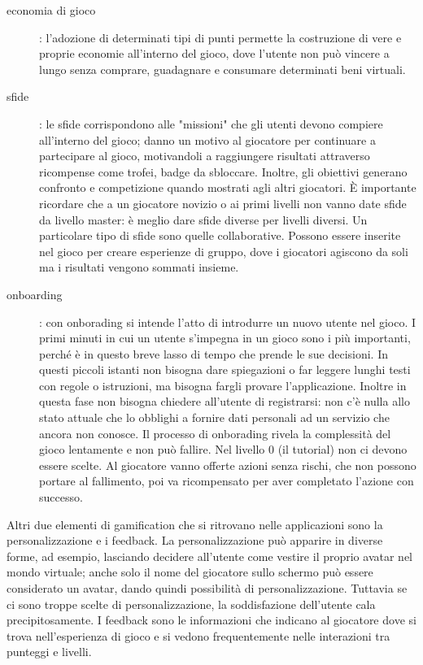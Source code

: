 \begin{description}
    \item[economia di gioco]: l'adozione di determinati tipi di punti permette la costruzione di vere e proprie economie all'interno del gioco, dove l'utente non può vincere a lungo senza comprare, guadagnare e consumare determinati beni virtuali.
    \item[sfide]: le sfide corrispondono alle "missioni" che gli utenti devono compiere all'interno del gioco; danno un motivo al giocatore per continuare a partecipare al gioco, motivandoli a raggiungere risultati attraverso ricompense come trofei, badge da sbloccare. Inoltre, gli obiettivi generano confronto e competizione quando mostrati agli altri giocatori. È importante ricordare che a un giocatore novizio o ai primi livelli non vanno date sfide da livello master: è meglio dare sfide diverse per livelli diversi. Un particolare tipo di sfide sono quelle collaborative. Possono essere inserite nel gioco per creare esperienze di gruppo, dove i giocatori agiscono da soli ma i risultati vengono sommati insieme.
    \item[onboarding]: con onborading si intende l'atto di introdurre un nuovo utente nel gioco. I primi minuti in cui un utente s'impegna in un gioco sono i più importanti, perché è in questo breve lasso di tempo che prende le sue decisioni. In questi piccoli istanti non bisogna dare spiegazioni o far leggere lunghi testi con regole o istruzioni, ma bisogna fargli provare l'applicazione. Inoltre in questa fase non bisogna chiedere all'utente di registrarsi: non c'è nulla allo stato attuale che lo obblighi a fornire dati personali ad un servizio che ancora non conosce. Il processo di onborading rivela la complessità del gioco lentamente e non può fallire. Nel livello 0 (il tutorial) non ci devono essere scelte. Al giocatore vanno offerte azioni senza rischi, che non possono portare al fallimento, poi va ricompensato per aver completato l'azione con successo.
\end{description}

Altri due elementi di gamification che si ritrovano nelle applicazioni sono la personalizzazione e i feedback.
La personalizzazione può apparire in diverse forme, ad esempio, lasciando decidere all'utente come vestire il proprio avatar nel mondo virtuale; anche solo il nome del giocatore sullo schermo può essere considerato un avatar, dando quindi possibilità di personalizzazione. Tuttavia se ci sono troppe scelte di personalizzazione, la soddisfazione dell'utente cala precipitosamente.
I feedback sono le informazioni che indicano al giocatore dove si trova nell'esperienza di gioco e si vedono frequentemente nelle interazioni tra punteggi e livelli.

